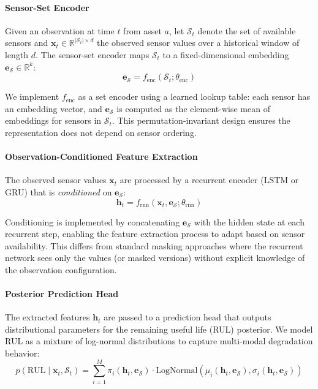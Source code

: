 \paragraph{Sensor-Set Encoder}
Given an observation at time $t$ from asset $a$, let $\mathcal{S}_t$ denote the set of available sensors and $\mathbf{x}_t \in \mathbb{R}^{|\mathcal{S}_t| \times d}$ the observed sensor values over a historical window of length $d$. The sensor-set encoder maps $\mathcal{S}_t$ to a fixed-dimensional embedding $\mathbf{e}_{\mathcal{S}} \in \mathbb{R}^{k}$:
\[
\mathbf{e}_{\mathcal{S}} = f_{\text{enc}}(\mathcal{S}_t; \theta_{\text{enc}})
\]

We implement $f_{\text{enc}}$ as a set encoder using a learned lookup table: each sensor has an embedding vector, and $\mathbf{e}_{\mathcal{S}}$ is computed as the element-wise mean of embeddings for sensors in $\mathcal{S}_t$. This permutation-invariant design ensures the representation does not depend on sensor ordering.

\paragraph{Observation-Conditioned Feature Extraction}
The observed sensor values $\mathbf{x}_t$ are processed by a recurrent encoder (LSTM or GRU) that is \emph{conditioned} on $\mathbf{e}_{\mathcal{S}}$:
\[
\mathbf{h}_t = f_{\text{rnn}}(\mathbf{x}_t, \mathbf{e}_{\mathcal{S}}; \theta_{\text{rnn}})
\]

Conditioning is implemented by concatenating $\mathbf{e}_{\mathcal{S}}$ with the hidden state at each recurrent step, enabling the feature extraction process to adapt based on sensor availability. This differs from standard masking approaches where the recurrent network sees only the values (or masked versions) without explicit knowledge of the observation configuration.

\paragraph{Posterior Prediction Head}
The extracted features $\mathbf{h}_t$ are passed to a prediction head that outputs distributional parameters for the remaining useful life (RUL) posterior. We model RUL as a mixture of log-normal distributions to capture multi-modal degradation behavior:
\[
p(\text{RUL} \mid \mathbf{x}_t, \mathcal{S}_t) = \sum_{i=1}^{M} \pi_i(\mathbf{h}_t, \mathbf{e}_{\mathcal{S}}) \cdot \text{LogNormal}(\mu_i(\mathbf{h}_t, \mathbf{e}_{\mathcal{S}}), \sigma_i(\mathbf{h}_t, \mathbf{e}_{\mathcal{S}}))
\]

